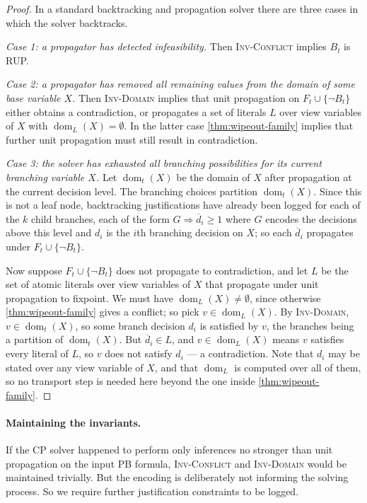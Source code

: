 \documentclass[11pt,a4paper]{article}
\theoremstyle{plain}
\theoremstyle{definition}
\theoremstyle{remark}
\newcommand{\fname}[1]{\ensuremath{\operatorname{#1}}}
\newcommand{\dm}{\fname{dom}}
\newcommand{\inv}[1]{\textnormal{\textsc{Inv-#1}}}
\newcommand{\invConflict}{\inv{Conflict}}
\newcommand{\invDomain}{\inv{Domain}}
\begin{document}
\begin{proof}
In a standard backtracking and propagation solver there are three cases in which
the solver backtracks.

\emph{Case 1: a propagator has detected infeasibility.}  Then \invConflict{}
implies $B_t$ is RUP.

\emph{Case 2: a propagator has removed all remaining values from the domain of
some base variable $X$.}  Then \invDomain{} implies that unit propagation on
$F_t\cup\{\neg B_t\}$ either obtains a contradiction, or propagates a set of
literals $L$ over view variables of $X$ with $\dm_L(X)=\emptyset$.  In the
latter case \cref{thm:wipeout-family} implies that further unit propagation must
still result in contradiction.

\emph{Case 3: the solver has exhausted all branching possibilities for its
current branching variable $X$.}  Let $\dm_t(X)$ be the domain of $X$ after
propagation at the current decision level.  The branching choices partition
$\dm_t(X)$.  Since this is not a leaf node, backtracking justifications have
already been logged for each of the $k$ child branches, each of the form
$G\Rightarrow \overline{d}_i\geq 1$ where $G$ encodes the decisions above this
level and $d_i$ is the $i$th branching decision on $X$; so each
$\overline{d}_i$ propagates under $F_t\cup\{\neg B_t\}$.

Now suppose $F_t\cup\{\neg B_t\}$ does not propagate to contradiction, and let
$L$ be the set of atomic literals over view variables of $X$ that propagate
under unit propagation to fixpoint.  We must have $\dm_L(X)\neq\emptyset$, since
otherwise \cref{thm:wipeout-family} gives a conflict; so pick $v\in\dm_L(X)$.
By \invDomain{}, $v\in\dm_t(X)$, so some branch decision $d_i$ is satisfied by
$v$, the branches being a partition of $\dm_t(X)$.  But $\overline{d}_i\in L$,
and $v\in\dm_L(X)$ means $v$ satisfies every literal of $L$, so $v$ does not
satisfy $d_i$ --- a contradiction.  Note that $d_i$ may be stated over any
view variable of $X$, and that $\dm_L$ is computed over all of them, so no
transport step is needed here beyond the one inside
\cref{thm:wipeout-family}.
\end{proof}

\paragraph{Maintaining the invariants.}
If the CP solver happened to perform only inferences no stronger than unit
propagation on the input PB formula, \invConflict{} and \invDomain{} would be
maintained trivially.  But the encoding is deliberately not informing the
solving process.  So we require further justification constraints to be logged.
\end{document}
